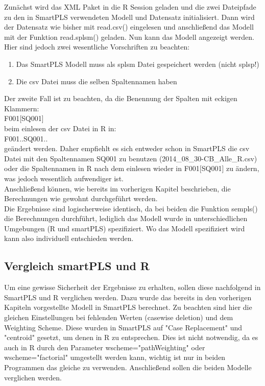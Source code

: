 \documentclass{article}\usepackage[]{graphicx}\usepackage[]{color}
\begin{document}
Zunächst wird das XML Paket in die R Session geladen und die zwei Dateipfade zu den in SmartPLS verwendeten Modell und Datensatz initialisiert. Dann wird der Datensatz wie bisher mit read.csv() eingelesen und anschließend das Modell mit der Funktion read.splsm() geladen. Nun kann das Modell angezeigt werden.\\
Hier sind jedoch zwei wesentliche Vorschriften zu beachten:
\begin{enumerate}
    \item Das SmartPLS Modell muss als splsm Datei gespeichert werden (nicht splsp!)
    \item Die csv Datei muss die selben Spaltennamen haben
\end{enumerate}
Der zweite Fall ist zu beachten, da die Benennung der Spalten mit eckigen Klammern: \\
F001[SQ001]\\
beim einlesen der csv Datei in R in:\\
F001..SQ001..\\
geändert werden. Daher empfiehlt es sich entweder schon in SmartPLS die csv Datei mit den Spaltennamen
SQ001 zu benutzen (2014\_08\_30-CB\_Alle\_R.csv) oder die Spaltennamen in R nach dem einlesen wieder in F001[SQ001] zu ändern, was jedoch wesentlich aufwendiger ist.\\
Anschließend können, wie bereits im vorherigen Kapitel beschrieben, die Berechnungen wie gewohnt durchgeführt werden.\\ Die Ergebnisse sind logischerweise identisch, da bei beiden die Funktion sempls() die Berechnungen durchführt, lediglich das Modell wurde in unterschiedlichen Umgebungen (R und smartPLS) spezifiziert. Wo das Modell spezifiziert wird kann also individuell entschieden werden.
\\

\subsection{Vergleich smartPLS und R}
Um eine gewisse Sicherheit der Ergebnisse zu erhalten, sollen diese nachfolgend in SmartPLS und R verglichen werden. Dazu wurde das bereits in den vorherigen Kapiteln vorgestellte Modell in SmartPLS berechnet. Zu beachten sind hier die gleichen Einstellungen bei fehlenden Werten (casewise deletion) und dem Weighting Scheme. Diese wurden in SmartPLS auf "Case Replacement" und "centroid" gesetzt, um denen in R zu entsprechen. Dies ist nicht notwendig, da es auch in R durch den Parameter wscheme="pathWeighting" oder wscheme="factorial"  umgestellt werden kann, wichtig ist nur in beiden Programmen das gleiche zu verwenden. Anschließend sollen die beiden Modelle verglichen werden.
\pagebreak
\end{document}
